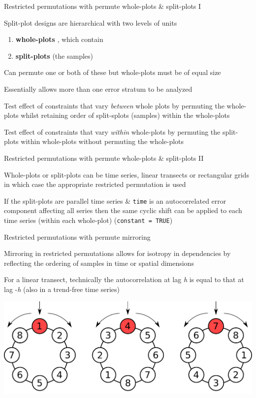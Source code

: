 \documentclass[10pt,ignorenonframetext,compress, aspectratio=169]{beamer}
\begin{document}
\begin{frame}{Restricted permutations with permute \textbar{}
whole-plots \& split-plots I}

Split-plot designs are hierarchical with two levels of units

\begin{enumerate}
\def\labelenumi{\arabic{enumi}.}
\itemsep1pt\parskip0pt
\item
  \textbf{whole-plots} , which contain
\item
  \textbf{split-plots} (the samples)
\end{enumerate}

Can permute one or both of these but whole-plots must be of equal size

Essentially allows more than one error stratum to be analyzed

Test effect of constraints that vary \emph{between} whole plots by
permuting the whole-plots whilst retaining order of split-splots
(samples) within the whole-plots

Test effect of constraints that vary \emph{within} whole-plots by
permuting the split-plots within whole-plots without permuting the
whole-plots

\end{frame}

\begin{frame}{Restricted permutations with permute \textbar{}
whole-plots \& split-plots II}

Whole-plots or split-plots can be time series, linear transects or
rectangular grids in which case the appropriate restricted permutation
is used

If the split-plots are parallel time series \& \texttt{time} is an
autocorrelated error component affecting all series then the same cyclic
shift can be applied to each time series (within each whole-plot)
(\texttt{constant\ =\ TRUE})

\end{frame}

\begin{frame}{Restricted permutations with permute \textbar{} mirroring}

Mirroring in restricted permutations allows for isotropy in dependencies
by reflecting the ordering of samples in time or spatial dimensions

For a linear transect, technically the autocorrelation at lag \emph{h}
is equal to that at lag -\emph{h} (also in a trend-free time series)

\includegraphics[width=\linewidth]{cyclic-shifts-with-mirror-figure}

\end{frame}
\end{document}
